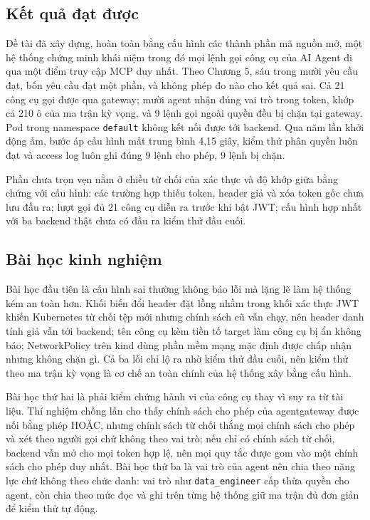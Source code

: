 
\subsection{Kết quả đạt được}

Đề tài đã xây dựng, hoàn toàn bằng cấu hình các thành phần mã nguồn mở, một hệ thống chứng minh khái niệm trong đó mọi lệnh gọi công cụ của AI Agent đi qua một điểm truy cập MCP duy nhất. Theo Chương 5, sáu trong mười yêu cầu đạt, bốn yêu cầu đạt một phần, và không phép đo nào cho kết quả sai. Cả 21 công cụ gọi được qua gateway; mười agent nhận đúng vai trò trong token, khớp cả 210 ô của ma trận kỳ vọng, và 9 lệnh gọi ngoài quyền đều bị chặn tại gateway. Pod trong namespace \texttt{default} không kết nối được tới backend. Qua năm lần khởi động ấm, bước áp cấu hình mất trung bình 4,15 giây, kiểm thử phân quyền luôn đạt và access log luôn ghi đúng 9 lệnh cho phép, 9 lệnh bị chặn.

Phần chưa trọn vẹn nằm ở chiều từ chối của xác thực và độ khớp giữa bằng chứng với cấu hình: các trường hợp thiếu token, header giả và xóa token gốc chưa lưu đầu ra; lượt gọi đủ 21 công cụ diễn ra trước khi bật JWT; cấu hình hợp nhất với ba backend thật chưa có đầu ra kiểm thử đầu cuối.


\subsection{Bài học kinh nghiệm}

Bài học đầu tiên là cấu hình sai thường không báo lỗi mà lặng lẽ làm hệ thống kém an toàn hơn. Khối biến đổi header đặt lồng nhầm trong khối xác thực JWT khiến Kubernetes từ chối tệp mới nhưng chính sách cũ vẫn chạy, nên header danh tính giả vẫn tới backend; tên công cụ kèm tiền tố target làm công cụ bị ẩn không báo; NetworkPolicy trên kind dùng phần mềm mạng mặc định được chấp nhận nhưng không chặn gì. Cả ba lỗi chỉ lộ ra nhờ kiểm thử đầu cuối, nên kiểm thử theo ma trận kỳ vọng là cơ chế an toàn chính của hệ thống xây bằng cấu hình.

Bài học thứ hai là phải kiểm chứng hành vi của công cụ thay vì suy ra từ tài liệu. Thí nghiệm chồng lấn cho thấy chính sách cho phép của agentgateway được nối bằng phép HOẶC, nhưng chính sách từ chối thắng mọi chính sách cho phép và xét theo người gọi chứ không theo vai trò; nếu chỉ có chính sách từ chối, backend vẫn mở cho mọi token hợp lệ, nên mọi quy tắc được gom vào một chính sách cho phép duy nhất. Bài học thứ ba là vai trò của agent nên chia theo năng lực chứ không theo chức danh: vai trò như \texttt{data\_engineer} cấp thừa quyền cho agent, còn chia theo mức đọc và ghi trên từng hệ thống giữ ma trận đủ đơn giản để kiểm thử tự động.

